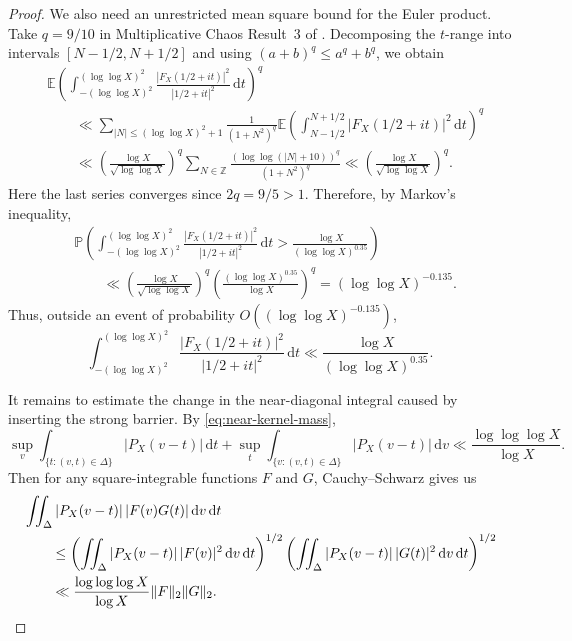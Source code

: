 \documentclass[a4paper,12pt,reqno]{amsart}
\numberwithin{equation}{section}
\theoremstyle{remark}
\newcommand{\E}{\mathbb{E}}
\newcommand{\p}{\mathbb{P}}
\begin{document}
\begin{proof}
We also need an unrestricted mean square bound for the Euler product.
Take $q=9/10$ in Multiplicative Chaos Result~3 of
\cite[Section~2.4]{Harper2023Large}.  Decomposing the $t$-range into
intervals $[N-1/2,N+1/2]$ and using $(a+b)^q\leq a^q+b^q$, we obtain
\[
\begin{aligned}
 &\E\left(
 \int_{-(\log\log X)^2}^{(\log\log X)^2}
 \frac{|F_X(1/2+it)|^2}{|1/2+it|^2}\,\mathrm{d}t
 \right)^q\\
 &\qquad\ll
 \sum_{|N|\leq(\log\log X)^2+1}
 \frac1{(1+N^2)^q}
 \E\left(
 \int_{N-1/2}^{N+1/2}
 |F_X(1/2+it)|^2\,\mathrm{d}t
 \right)^q\\
 &\qquad\ll
 \left(\frac{\log X}{\sqrt{\log\log X}}\right)^q
 \sum_{N\in\mathbb Z}
 \frac{(\log\log(|N|+10))^q}{(1+N^2)^q}\ll
 \left(\frac{\log X}{\sqrt{\log\log X}}\right)^q.
\end{aligned}
\]
Here the last series converges since $2q=9/5>1$.
Therefore, by Markov's inequality,
\[
\begin{aligned}
 &\p\left(
 \int_{-(\log\log X)^2}^{(\log\log X)^2}
 \frac{|F_X(1/2+it)|^2}{|1/2+it|^2}\,\mathrm{d}t
 >
 \frac{\log X}{(\log\log X)^{0.35}}
 \right)\\
 &\qquad\ll
 \left(\frac{\log X}{\sqrt{\log\log X}}\right)^q
 \left(\frac{(\log\log X)^{0.35}}{\log X}\right)^q
 =
 (\log\log X)^{-0.135}.
\end{aligned}
\]
Thus, outside an event of probability
$O((\log\log X)^{-0.135})$,
\begin{equation}\label{eq:unrestricted-energy}
 \int_{-(\log\log X)^2}^{(\log\log X)^2}
 \frac{|F_X(1/2+it)|^2}{|1/2+it|^2}\,\mathrm{d}t
 \ll
 \frac{\log X}{(\log\log X)^{0.35}}.
\end{equation}


It remains to estimate the change in the near-diagonal integral caused by
inserting the strong barrier.  By \eqref{eq:near-kernel-mass},
\[
 \sup_v\int_{\{t:(v,t)\in\Delta\}}|P_X(v-t)|\,\mathrm{d}t
 +
 \sup_t\int_{\{v:(v,t)\in\Delta\}}|P_X(v-t)|\,\mathrm{d}v
 \ll
 \frac{\log\log\log X}{\log X}.
\]
Then for any square-integrable functions $F$ and $G$,
Cauchy--Schwarz gives us
 \begin{align}
 &\iint_{\Delta}
 |P_X(v-t)|\,|F(v)G(t)|\,\mathrm{d}v\,\mathrm{d}t\notag\\
 &\qquad\leq
 \left(
 \iint_{\Delta}
 |P_X(v-t)|\,|F(v)|^2\,\mathrm{d}v\,\mathrm{d}t
 \right)^{1/2}
 \left(
 \iint_{\Delta}
 |P_X(v-t)|\,|G(t)|^2\,\mathrm{d}v\,\mathrm{d}t
 \right)^{1/2}\notag\\
 &\qquad\ll
 \frac{\log\log\log X}{\log X}
 \|F\|_2\|G\|_2.\label{eq:CSinq}
 \end{align}



\end{proof}
\end{document}
